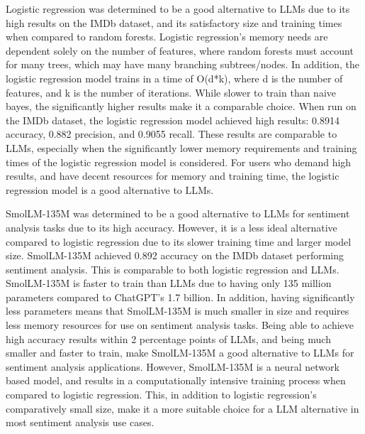 \documentclass[10pt,twocolumn,letterpaper]{article}
\begin{document}
Logistic regression was determined to be a good alternative to LLMs due to its high results on the IMDb dataset, and its satisfactory size and training times when compared to random forests. Logistic regression’s memory needs are dependent solely on the number of features, where random forests must account for many trees, which may have many branching subtrees/nodes. In addition, the  logistic regression model trains in a time of O(d*k), where d is the number of features, and k is the number of iterations. While slower to train than naive bayes, the significantly higher results make it a comparable choice. When run on the IMDb dataset, the logistic regression model achieved high results: 0.8914 accuracy, 0.882 precision, and 0.9055 recall. These results are comparable to LLMs, especially when the significantly lower memory requirements and training times of the logistic regression model is considered. For users who demand high results, and have decent resources for memory and training time, the logistic regression model is a good alternative to LLMs.

SmolLM-135M was determined to be a good alternative to LLMs for sentiment analysis tasks due to its high accuracy. However, it is a less ideal alternative compared to logistic regression due to its slower training time and larger model size. SmolLM-135M achieved 0.892 accuracy on the IMDb dataset performing sentiment analysis. This is comparable to both logistic regression and LLMs. SmolLM-135M is faster to train than LLMs due to having only 135 million parameters compared to ChatGPT’s 1.7 billion. In addition, having significantly less parameters means that SmolLM-135M is much smaller in size and requires less memory resources for use on sentiment analysis tasks. Being able to achieve high accuracy results within 2 percentage points of LLMs, and being much smaller and faster to train, make SmolLM-135M a good alternative to LLMs for sentiment analysis applications. However, SmolLM-135M is a neural network based model, and results in a computationally intensive training process when compared to logistic regression. This, in addition to logistic regression’s comparatively small size, make it a more suitable choice for a LLM alternative in most sentiment analysis use cases. 
\end{document}
